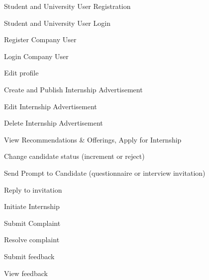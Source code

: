 \begin{enumerate}[label={[UC\arabic*]}]
    \item Student and University User Registration
    \item Student and University User Login
    \item Register Company User
    \item Login Company User
    \item Edit profile
    \item Create and Publish Internship Advertisement
    \item Edit Internship Advertisement
    \item Delete Internship Advertisement
    \item View Recommendations \& Offerings, Apply for Internship
    \item Change candidate status (increment or reject)
    \item Send Prompt to Candidate (questionnaire or interview invitation)
    \item Reply to invitation
    \item Initiate Internship
    \item Submit Complaint
    \item Resolve complaint
    \item Submit feedback
    \item View feedback
\end{enumerate}